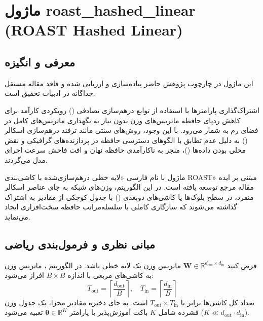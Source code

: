 \section{ماژول roast\_hashed\_linear (ROAST Hashed Linear)}
\label{sec:module_roast_hashed_linear}

\subsection{معرفی و انگیزه}
این ماژول در چارچوب پژوهش حاضر پیاده‌سازی و ارزیابی شده و فاقد مقاله مستقل جداگانه در ادبیات تحقیق است.

اشتراک‌گذاری پارامترها با استفاده از توابع درهم‌سازی تصادفی () رویکردی کارآمد برای کاهش ردپای حافظه ماتریس‌های وزن بدون نیاز به نگهداری ماتریس‌های کامل در فضای رم به شمار می‌رود. با این وجود، روش‌های سنتی مانند ترفند درهم‌سازی اسکالر () به دلیل عدم تطابق با الگوهای دسترسی حافظه در پردازنده‌های گرافیکی و نقض محلی بودن داده‌ها ()، منجر به ناکارآمدی حافظه نهان و افت فاحش سرعت اجرای مدل می‌گردند.

ماژول  با نام فارسی «لایه خطی درهم‌سازی‌شده با کاشی‌بندی ROAST» مبتنی بر ایده مقاله مرجع  توسعه یافته است. در این الگوریتم، وزن‌های شبکه به جای عناصر اسکالر منفرد، در سطح بلوک‌ها یا کاشی‌های دوبعدی () با جدول کوچکی از مقادیر به اشتراک گذاشته می‌شوند که سازگاری کاملی با سلسله‌مراتب حافظه سخت‌افزاری ایجاد می‌نماید.

\subsection{مبانی نظری و فرمول‌بندی ریاضی}
فرض کنید $\mathbf{W} \in \mathbb{R}^{d_{\text{out}} \times d_{\text{in}}}$ ماتریس وزن یک لایه خطی باشد. در الگوریتم ، ماتریس وزن به کاشی‌های مربعی با اندازه $B \times B$ افراز می‌شود:
\begin{equation}
T_{\text{out}} = \left\lceil \frac{d_{\text{out}}}{B} \right\rceil, \quad T_{\text{in}} = \left\lceil \frac{d_{\text{in}}}{B} \right\rceil
\end{equation}
تعداد کل کاشی‌ها برابر با $T_{\text{out}} \times T_{\text{in}}$ است. به جای ذخیره مقادیر مجزا، یک جدول وزن فشرده شامل $K$ باکت آموزش‌پذیر با پارامتر $\boldsymbol{\theta} \in \mathbb{R}^K$ تعبیه می‌شود ($K \ll d_{\text{out}} \cdot d_{\text{in}}$).

